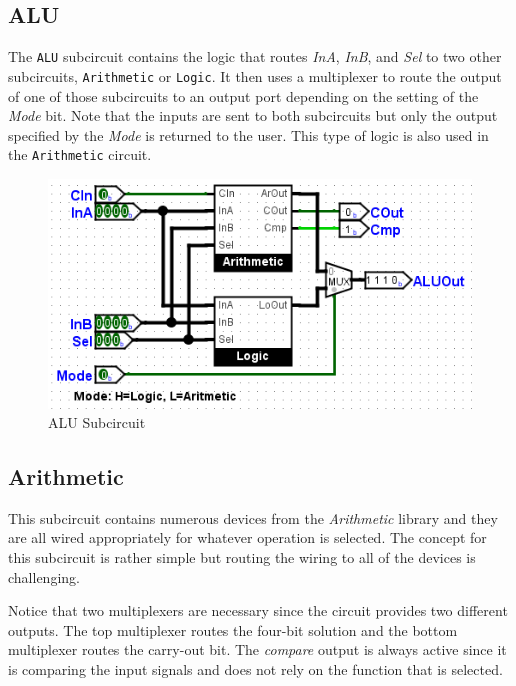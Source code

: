 \subsection{ALU}

The \lstinline[columns=fixed]|ALU| subcircuit contains the logic that routes \textit{InA}, \textit{InB}, and \textit{Sel} to two other subcircuits, \lstinline[columns=fixed]|Arithmetic| or \lstinline[columns=fixed]|Logic|. It then uses a multiplexer to route the output of one of those subcircuits to an output port depending on the setting of the \textit{Mode} bit. Note that the inputs are sent to both subcircuits but only the output specified by the \textit{Mode} is returned to the user. This type of logic is also used in the \lstinline[columns=fixed]|Arithmetic| circuit.

\begin{figure}[H]
	\centering
	\includegraphics[width=\maxwidth{.95\linewidth}]{gfx/alu-02}
	\caption{ALU Subcircuit}
	\label{fig:alu-02}
\end{figure}

\subsection{Arithmetic}

This subcircuit contains numerous devices from the \textit{Arithmetic} library and they are all wired appropriately for whatever operation is selected. The concept for this subcircuit is rather simple but routing the wiring to all of the devices is challenging.

Notice that two multiplexers are necessary since the circuit provides two different outputs. The top multiplexer routes the four-bit solution and the bottom multiplexer routes the carry-out bit. The \textit{compare} output is always active since it is comparing the input signals and does not rely on the function that is selected.

